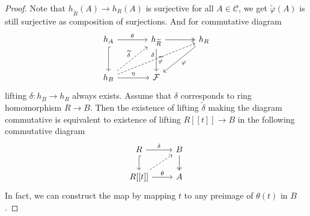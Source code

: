 \documentclass{ctexart}
\begin{document}
\begin{proof}
    Note that $h_{\widetilde{R}}(A) \rightarrow h_{R}(A)$ is surjective for all $A\in \mathcal{C}$, 
    we get $\widetilde{\varphi}(A)$ is still surjective as composition of surjections.
    And for commutative diagram 
    \begin{equation}
        \begin{tikzcd}[sep = large]
            h_{A} \arrow[r, "\theta"] \arrow[d, hookrightarrow] &
            h_{\widetilde{R}} \arrow[r, twoheadrightarrow] \arrow[d, "\widetilde{\varphi}"] &
            h_{R} \arrow[dl, "\varphi"] \\
            h_{B} \arrow[ur, dashrightarrow, "\widetilde{\delta}"] \arrow[urr, dashrightarrow, "\delta"] \arrow[r, "\eta"] &
            \mathcal{F}
        \end{tikzcd}
    \end{equation}
    lifting $\delta: h_{B} \rightarrow h_{R}$ always exists.
    Assume that $\delta$ corresponds to ring homomorphism $R \rightarrow B$.
    Then the existence of lifting $\widetilde{\delta}$ making the diagram commutative is equivalent to existence of lifting $R[[t]] \rightarrow B$ in the following commutative diagram
    \begin{equation}
        \begin{tikzcd}
            R \arrow[r, "\delta"] \arrow[d, hookrightarrow] &
            B \arrow[d, twoheadrightarrow] \\
            R[[t]] \arrow[ur, dashrightarrow] \arrow[r, "\theta"] &
            A 
        \end{tikzcd}
    \end{equation}
    In fact, we can construct the map by mapping $t$ to any preimage of $\theta(t)$ in $B$.
\end{proof}
\end{document}
